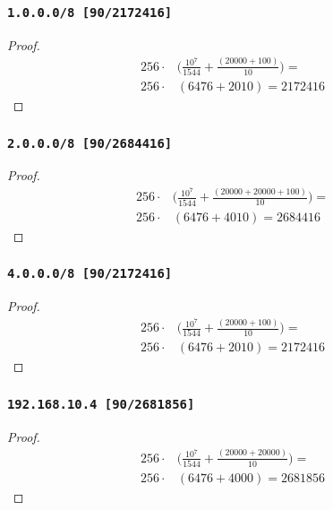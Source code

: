 \documentclass[12pt, times]{simauth}
\begin{document}
\begin{minipage}[t]{0.45\linewidth}
\subsubsection{\texttt{1.0.0.0/8 [90/2172416]}}
\begin{proof}
    \begin{align*}
        256 \cdot & \bigg(\frac{10^7}{1544} + \frac{(20000 + 100)}{10}\bigg) = \\
        256 \cdot & (6476 + 2010) = 2172416
    \end{align*}
\end{proof}
\subsubsection{\texttt{2.0.0.0/8 [90/2684416]}}
\begin{proof}
    \begin{align*}
        256 \cdot & \bigg(\frac{10^7}{1544} + \frac{(20000 + 20000 + 100)}{10}\bigg) = \\
        256 \cdot & (6476 + 4010) = 2684416
    \end{align*}
\end{proof}
\end{minipage} \hfill
\begin{minipage}[t]{0.45\linewidth}  
\subsubsection{\texttt{4.0.0.0/8 [90/2172416]}}
\begin{proof}
    \begin{align*}
        256 \cdot & \bigg(\frac{10^7}{1544} + \frac{(20000 + 100)}{10}\bigg) = \\
        256 \cdot & (6476 + 2010) = 2172416
    \end{align*}
\end{proof}
\subsubsection{\texttt{192.168.10.4 [90/2681856]}}
\begin{proof}
    \begin{align*}
        256 \cdot & \bigg(\frac{10^7}{1544} + \frac{(20000 + 20000)}{10}\bigg) = \\
        256 \cdot & (6476 + 4000) = 2681856
    \end{align*}
\end{proof}

\end{minipage}
\end{document}
